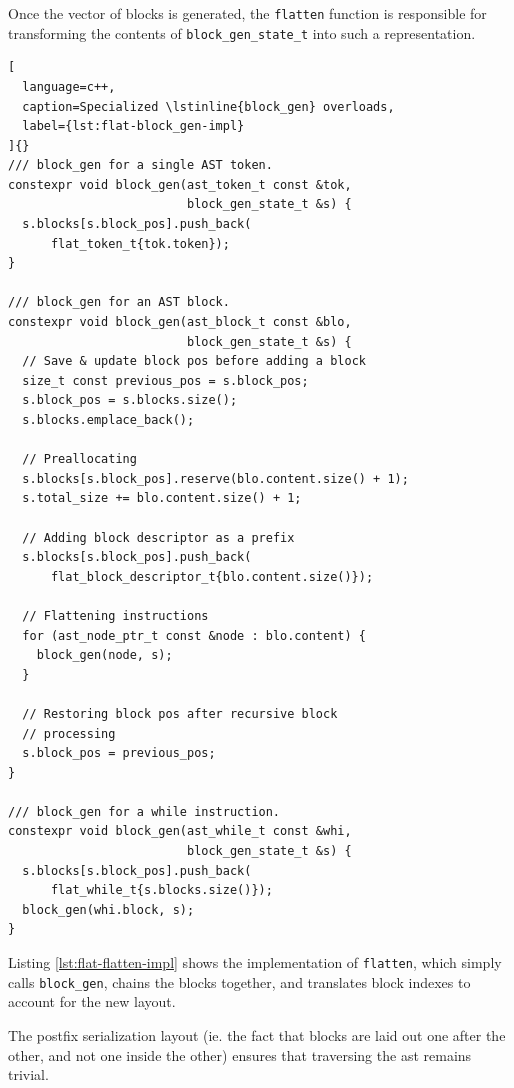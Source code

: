 \documentclass[../main]{subfiles}
\begin{document}
Once the vector of blocks is generated, the \lstinline{flatten} function
is responsible for transforming the contents of \lstinline{block_gen_state_t}
into such a representation.

\clearpage%

\begin{lstlisting}[
  language=c++,
  caption=Specialized \lstinline{block_gen} overloads,
  label={lst:flat-block_gen-impl}
]{}
/// block_gen for a single AST token.
constexpr void block_gen(ast_token_t const &tok,
                         block_gen_state_t &s) {
  s.blocks[s.block_pos].push_back(
      flat_token_t{tok.token});
}

/// block_gen for an AST block.
constexpr void block_gen(ast_block_t const &blo,
                         block_gen_state_t &s) {
  // Save & update block pos before adding a block
  size_t const previous_pos = s.block_pos;
  s.block_pos = s.blocks.size();
  s.blocks.emplace_back();

  // Preallocating
  s.blocks[s.block_pos].reserve(blo.content.size() + 1);
  s.total_size += blo.content.size() + 1;

  // Adding block descriptor as a prefix
  s.blocks[s.block_pos].push_back(
      flat_block_descriptor_t{blo.content.size()});

  // Flattening instructions
  for (ast_node_ptr_t const &node : blo.content) {
    block_gen(node, s);
  }

  // Restoring block pos after recursive block
  // processing
  s.block_pos = previous_pos;
}

/// block_gen for a while instruction.
constexpr void block_gen(ast_while_t const &whi,
                         block_gen_state_t &s) {
  s.blocks[s.block_pos].push_back(
      flat_while_t{s.blocks.size()});
  block_gen(whi.block, s);
}
\end{lstlisting}

Listing \ref{lst:flat-flatten-impl} shows the implementation of
\lstinline{flatten}, which simply calls \lstinline{block_gen},
chains the blocks together, and translates block indexes to account for
the new layout.

The postfix serialization layout (ie. the fact that blocks are laid out
one after the other, and not one inside the other) ensures that
traversing the \gls{ast} remains trivial.

\clearpage%
\end{document}
